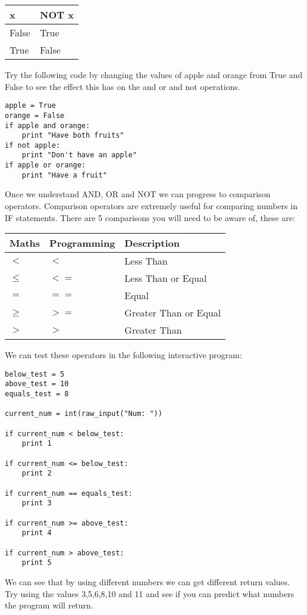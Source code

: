 \documentclass[twocolumn]{article}
\begin{document}
\begin{center}
\begin{tabular}{ll} 
		\toprule
		x & NOT x \\
		\midrule
		False & True \\
		True & False \\
		\bottomrule
	\end{tabular}
\end{center}
Try the following code by changing the values of apple and orange from True and False to see the effect this has on the and or and not operations.
\begin{lstlisting}
apple = True
orange = False
if apple and orange:
	print "Have both fruits"
if not apple:
	print "Don't have an apple"
if apple or orange:
	print "Have a fruit"
\end{lstlisting}
Once we understand AND, OR and NOT we can progress to comparison operators. Comparison operators are extremely useful for comparing numbers in IF statements. There are 5 comparisons you will need to be aware of, these are:
\begin{center}
	\begin{tabular}{lll} 
		\toprule
		Maths & Programming & Description\\
		\midrule
		$<$ & $<$ & Less Than\\
		$\le$ & $<=$ & Less Than or Equal\\
		$=$ & $==$ & Equal\\
		$\ge$ & $>=$ & Greater Than or Equal\\
		$>$ & $>$ & Greater Than\\
		\bottomrule
	\end{tabular}
\end{center}
We can test these operators in the following interactive program:
\begin{lstlisting}
below_test = 5
above_test = 10
equals_test = 8

current_num = int(raw_input("Num: "))

if current_num < below_test:
	print 1

if current_num <= below_test:
	print 2

if current_num == equals_test:
	print 3

if current_num >= above_test:
	print 4

if current_num > above_test:
	print 5
\end{lstlisting}
We can see that by using different numbers we can get different return values. Try using the values 3,5,6,8,10 and 11 and see if you can predict what numbers the program will return.
\end{document}
